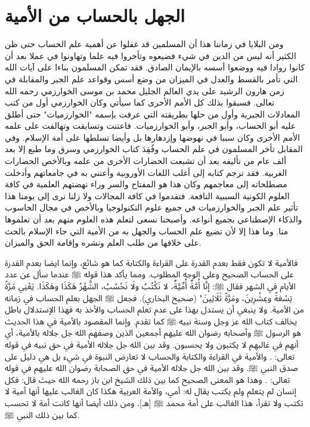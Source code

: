 \section{الجهل بالحساب من الأمية}

ومن البلايا في زماننا هذا أن المسلمين قد غفلوا عن أهمية علم الحساب حتى ظن الكثير أنه ليس من الدين في شيء فضيعوه وتأخروا فيه علما وتهاونوا في عملا بعد أن كانوا روادا فيه ووضعوا أسسه بالإيمان الصادق. فقد تمكن المسلمون  بناءا على آيات الله التي تأمر بالقسط والعدل في الميزان من وضع أسس وقواعد علم الجبر والمقابلة في زمن هارون الرشيد على يدي العالم الجليل محمد بن موسى الخوارزمي رحمه الله تعالى. فسبقوا بذلك كل الأمم الأخرى كما سيأتي وكان الخوارزمي أول من كتب المعادلات الجبرية وأول من حلها بطريقته التي عرفت بإسمه "الخوارزميات" حتى أطلق عليه أبو الحساب، وأبو الجبر، وأبو الخوارزميات. فاعتنت وتسابقت وتهالفت على علمه الأمم الأخرى وكان سببا في نهوضها وإزدهارها بل وأيضا تسلطها على أمة الإسلام. وفي المقابل تأخر المسلمون في علم الحساب وفُقِدَ كتاب الخوارزمي وسرق وما طبع إلا بعد ألف عام من تأليفه بعد أن تشبعت الحضارات الأخرى من علمه وبالأخص الحضارات الغربية. فقد ترجم كتابه إلى أغلب اللغات الأوروبية وأعتني به في جامعاتهم وأدخلت مصطلحاته إلى معاجمهم وكان هذا هو المفتاح والسر وراء نهضتهم العلمية في كافة العلوم الكونية السببية النافعة. فتقدموا في كافة المجالات ولا زلنا نرى إلى يومنا هذا تأثير علم الجبر والخوارزميات في جميع علوم التكنولوجيا وبالأخص في مجال الحاسوب والذكاء الإصطناعي بجميع أنواعه. وأصبحنا نسعى لتعلم هذه العلوم منهم بعد أن تعلموها منا. وما هذا إلا لأن تضيع علم الحساب والجهل به من الأمية التي جاء الإسلام بالحث على خلافها من طلب العلم ونشره وإقامة الحق والميزان. 

فالأمية لا تكون فقط بعدم القدرة على القراءة والكتابة كما هو شائع، وإنما ايضا بعدم القدرة على الحساب الصحيح وعلى الوجه المطلوب. ومما يأكد هذا قوله ﷺ عندما سأل عن عدد الأيام في الشهر فقال ﷺ: إنَّا أُمَّةٌ أُمِّيَّةٌ، لا نَكْتُبُ ولَا نَحْسُبُ، الشَّهْرُ هَكَذَا وهَكَذَا. يَعْنِي مَرَّةً تِسْعَةً وعِشْرِينَ، ومَرَّةً ثَلَاثِينَ" {\footnotesize (صحيح البخاري)}. فجعل ﷺ الجهل بعلم الحساب في زمانه من الأمية. ولا ينبغي أن يستدل بهذا على عدم تعلم الحساب والأخذ به فهذا الإستدلال باطل يخالف كتاب الله عز وجل وسنة نبيه ﷺ كما تقدم. وإنما المقصود بالأمية في هذا الحديث هو الرسول ﷺ وأصحابه رضوان الله عليهم أجمعين الذين وصفهم الله جل جلاله بالأمية، أي أنهم في غالبهم لا يكتبون ولا يحسبون. وقد بين الله جل جلاله الأمية في حق نبيه في قوله تعالى: \quranayah*[7][158][21]{\footnotesize \surahname*[7]}. والأمية في القراءة والكتابة والحساب لا تعارض النبوة في شيء بل هي دليل على صدق النبي ﷺ. وقد بين الله جل جلاله الأمية في حق الصحابة رضوان الله عليهم في قوله تعالى: \quranayah*[62][2]{\footnotesize \surahname*[62]}. وهذا هو المعنى الصحيح كما بين ذلك الشيخ ابن باز رحمه الله حيث قال: فكل إنسان لم يتعلم ولم يكتب يقال له: أمي، والأمة العربية هكذا كان الغالب عليها أنها أمية لا تكتب ولا تقرأ، هذا الغالب على أمة محمد ﷺ [هـ]. ومن ذلك أيضا أنها كانت أمة لا تحسب كما بين ذلك النبي ﷺ.

